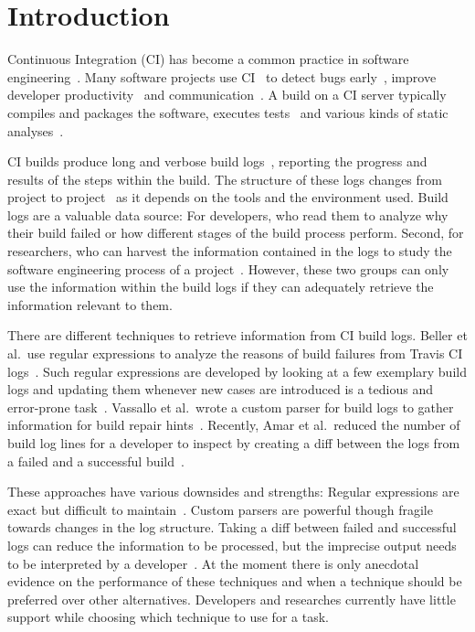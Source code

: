 \documentclass[\myrootdir/main.tex]{subfiles}
\begin{document}
\chapter{Introduction}
Continuous Integration (CI) has become a common practice in software engineering~\cite{hilton2016usage}.
Many software projects use CI~\cite{hilton2016usage,staahl2014modeling,beller2017oops} to detect bugs early~\cite{vasilescu2015quality,duvall2007continuous}, improve developer productivity~\cite{miller2008hundred,hilton2016usage} and communication~\cite{downs2012ambient}.
A build on a CI server typically compiles and packages the software, executes tests~\cite{beller2017oops} and various kinds of static analyses~\cite{zampetti2017open}.

CI builds produce long and verbose build logs~\cite{beller2017oops}, reporting the progress and results of the steps within the build.
The structure of these logs changes from project to project~\cite{staahl2014modeling} as it depends on the tools and the environment used.
Build logs are a valuable data source: For developers, who read them to analyze why their build failed or how different stages of the build process perform.
Second, for researchers, who can harvest the information contained in the logs to study the software engineering process of a project~\cite{rausch2017empirical,beller2017oops,seo2014programmers,vassallo2017a-tale}.
However, these two groups can only use the information within the build logs if they can adequately retrieve the information relevant to them.

There are different techniques to retrieve information from CI build logs. Beller et al.\ use regular expressions to analyze the reasons of build failures from Travis CI logs~\cite{beller2017oops}.
Such regular expressions are developed by looking at a few exemplary build logs and updating them whenever new cases are introduced is a tedious and error-prone task~\cite{michael2019regexes}.
Vassallo et al.\ wrote a custom parser for build logs to gather information for build repair hints~\cite{vassallo2018un-break}.
Recently, Amar et al.\ reduced the number of build log lines for a developer to inspect by creating a diff between the logs from a failed and a successful build~\cite{amar2019mining}.

These approaches have various downsides and strengths:
Regular expressions are exact but difficult to maintain~\cite{michael2019regexes}.
Custom parsers are powerful though fragile towards changes in the log structure.
Taking a diff between failed and successful logs can reduce the information to be processed, but the imprecise output needs to be interpreted by a developer~\cite{amar2019mining}.
At the moment there is only anecdotal evidence on the performance of these techniques and when a technique should be preferred over other alternatives.
Developers and researches currently have little support while choosing which technique to use for a task.
\end{document}
